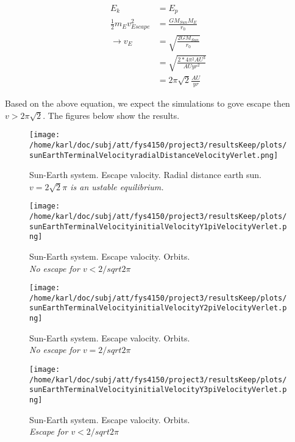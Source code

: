 \documentclass{article}
\begin{document}
\begin{subequations}
	\begin{align}
	E_k  &= E_p \\
	\frac{1}{2} m_E v_{Escape}^2&= \frac{G M_{Sun} M_E}{r_0}\\
	\rightarrow v_E&=\sqrt{\frac{2G M_{Sun} }{r_0}}\\
	&=\sqrt{\frac{2* 4 \pi^2 AU^3 }{AU yr^2}}\\
	&=2 \pi\sqrt{2}\frac{ AU }{yr}
	\end{align}
\end{subequations}

Based on the above equation, we expect the simulations to gove escape then $v > 2\pi \sqrt{2}$. The figures below show the results.

\begin{figure}[H]
	\centering
	\texttt{[image: /home/karl/doc/subj/att/fys4150/project3/resultsKeep/plots/sunEarthTerminalVelocityradialDistanceVelocityVerlet.png]}
	\caption{Sun-Earth system. Escape valocity. Radial distance earth sun. \\ \textit{$v = 2\sqrt{2}\pi$ is an ustable equilibrium.}}
	\label{1}
\end{figure}



\begin{minipage}{.33\textwidth} 
	\begin{figure}[H]
		\centering
		\texttt{[image: /home/karl/doc/subj/att/fys4150/project3/resultsKeep/plots/sunEarthTerminalVelocityinitialVelocityY1piVelocityVerlet.png]}
		\caption{Sun-Earth system. Escape valocity. Orbits. \\ \textit{No escape for $v < 2/sqrt{2} \pi$}}
		\label{1}
	\end{figure}
\end{minipage}\hfill
\begin{minipage}{.33\textwidth} 
	\begin{figure}[H]
		\centering
		\texttt{[image: /home/karl/doc/subj/att/fys4150/project3/resultsKeep/plots/sunEarthTerminalVelocityinitialVelocityY2piVelocityVerlet.png]}
		\caption{Sun-Earth system. Escape valocity. Orbits. \\ \textit{No escape for $v = 2/sqrt{2} \pi$}}
		\label{1}
	\end{figure}
\end{minipage}\hfill
\begin{minipage}{.33\textwidth} 
	\begin{figure}[H]
		\centering
		\texttt{[image: /home/karl/doc/subj/att/fys4150/project3/resultsKeep/plots/sunEarthTerminalVelocityinitialVelocityY3piVelocityVerlet.png]}
		\caption{Sun-Earth system. Escape valocity. Orbits. \\ \textit{Escape for $v < 2/sqrt{2} \pi$}}
		\label{1}
	\end{figure}
\end{minipage}\hfill
\vspace{2ex}
\end{document}
